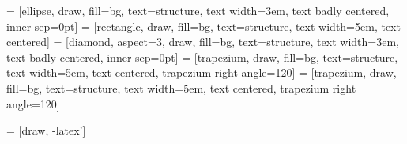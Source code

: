 \usepackage{tikz}
\usetikzlibrary{shapes,arrows,positioning,calc}

 = [ellipse, draw, fill=bg, text=structure, text width=3em, text badly centered, inner sep=0pt]
 = [rectangle, draw, fill=bg, text=structure, text width=5em, text centered]
 = [diamond, aspect=3, draw, fill=bg, text=structure, text width=3em, text badly centered, inner sep=0pt]
 = [trapezium, draw, fill=bg, text=structure, text width=5em, text centered, trapezium right angle=120]
 = [trapezium, draw, fill=bg, text=structure, text width=5em, text centered, trapezium right angle=120]

 = [draw, -latex']
